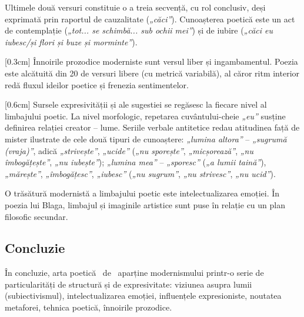 Ultimele două versuri constituie o a treia secvență, cu rol conclusiv, deși exprimată prin raportul de cauzalitate (\textit{„căci”}). Cunoașterea poetică este un act de contemplație (\textit{„tot... se schimbă... sub ochii mei”}) și de iubire (\textit{„căci eu iubesc/și flori și buze și morminte”}).

[0.3cm]
Înnoirile prozodice moderniste sunt versul liber și ingambamentul. Poezia este alcătuită din 20 de versuri libere (cu metrică variabilă), al căror ritm interior redă fluxul ideilor poetice și frenezia sentimentelor.

[0.6cm]
Sursele expresivității și ale sugestiei se regăsesc la fiecare nivel al limbajului poetic. La nivel morfologic, repetarea cuvântului-cheie \textit{„eu”} susține definirea relației creator -- lume. Seriile verbale antitetice redau atitudinea față de mister ilustrate de cele două tipuri de cunoaștere: \textit{„lumina altora”} -- \textit{„sugrumă (vraja)”}, adică \textit{„strivește”}, \textit{„ucide”} (\textit{„nu sporește”}, \textit{„micșorează”}, \textit{„nu îmbogățește”}, \textit{„nu iubește”}); \textit{„lumina mea”} -- \textit{„sporesc”} (\textit{„a lumii taină”}), \textit{„mărește”}, \textit{„îmbogățesc”}, \textit{„iubesc”} (\textit{„nu sugrum”}, \textit{„nu strivesc”}, \textit{„nu ucid”}).

O trăsătură modernistă a limbajului poetic este intelectualizarea emoției. În poezia lui Blaga, limbajul și imaginile artistice sunt puse în relație cu un plan filosofic secundar.

\subsection{Concluzie}

În concluzie, arta poetică \operatitle\ de \operaauthor\ aparține modernismului printr-o serie de particularități de structură și de expresivitate: viziunea asupra lumii (subiectivismul), intelectualizarea emoției, influențele expresioniste, noutatea metaforei, tehnica poetică, înnoirile prozodice.
